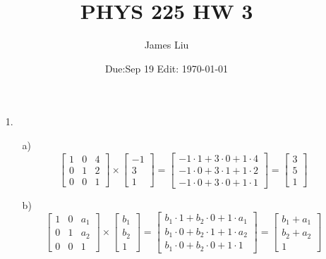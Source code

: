 \documentclass{article}
\date{Due:Sep 19 Edit: \today}
\title{PHYS 225 HW 3}
\author{James Liu}
\begin{document}
\maketitle
\begin{itemize}
    \item[1.]
    \begin{itemize}
        \item [a)]
        \[\begin{bmatrix}
            1&0&4\\0&1&2\\0&0&1
        \end{bmatrix}\times\begin{bmatrix}
            -1\\3\\1
        \end{bmatrix}=\begin{bmatrix}
            -1\cdot1+3\cdot0+1\cdot4\\
            -1\cdot0+3\cdot1+1\cdot2\\
            -1\cdot0+3\cdot0+1\cdot1
        \end{bmatrix}=\begin{bmatrix}
            3\\5\\1
        \end{bmatrix}\]
        
        \item [b)]
        \[\begin{bmatrix}
            1&0&a_1\\0&1&a_2\\0&0&1
        \end{bmatrix}\times\begin{bmatrix}
            b_1\\b_2\\1
        \end{bmatrix}=\begin{bmatrix}
            b_1\cdot1+b_2\cdot0+1\cdot a_1\\
            b_1\cdot0+b_2\cdot1+1\cdot a_2\\
            b_1\cdot0+b_2\cdot0+1\cdot1
        \end{bmatrix}=\begin{bmatrix}
            b_1+a_1\\b_2+a_2\\1
        \end{bmatrix}\]
        

\end{itemize}
\end{itemize}
\end{document}
